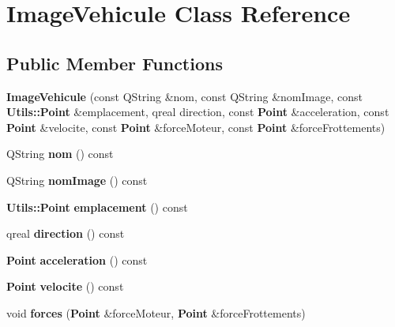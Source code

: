 \section{\-Image\-Vehicule \-Class \-Reference}
\label{class_image_vehicule}
\subsection*{\-Public \-Member \-Functions}
\begin{DoxyCompactItemize}
\item 
{\bf \-Image\-Vehicule} (const \-Q\-String \&nom, const \-Q\-String \&nom\-Image, const {\bf \-Utils\-::\-Point} \&emplacement, qreal direction, const {\bf \-Point} \&acceleration, const {\bf \-Point} \&velocite, const {\bf \-Point} \&force\-Moteur, const {\bf \-Point} \&force\-Frottements)
\item 
\-Q\-String {\bfseries nom} () const \label{class_image_vehicule_aa3c09b783b399386cee0f1fe39e1b433}

\item 
\-Q\-String {\bfseries nom\-Image} () const \label{class_image_vehicule_a2b9e880fa349faca38df47ef56660821}

\item 
{\bf \-Utils\-::\-Point} {\bfseries emplacement} () const \label{class_image_vehicule_af4317199980da2aab7b1d740517e4a74}

\item 
qreal {\bfseries direction} () const \label{class_image_vehicule_a26a8ef4cffddd03bd3ba0b37278eda4b}

\item 
{\bf \-Point} {\bfseries acceleration} () const \label{class_image_vehicule_a94af4b94f2b357ca8f24418a0061e040}

\item 
{\bf \-Point} {\bfseries velocite} () const \label{class_image_vehicule_a9b9fddf6bfe70cc493f43497fe619a7c}

\item 
void {\bfseries forces} ({\bf \-Point} \&force\-Moteur, {\bf \-Point} \&force\-Frottements)\label{class_image_vehicule_a83319e6761213245b9b464001a073564}

\end{DoxyCompactItemize}
